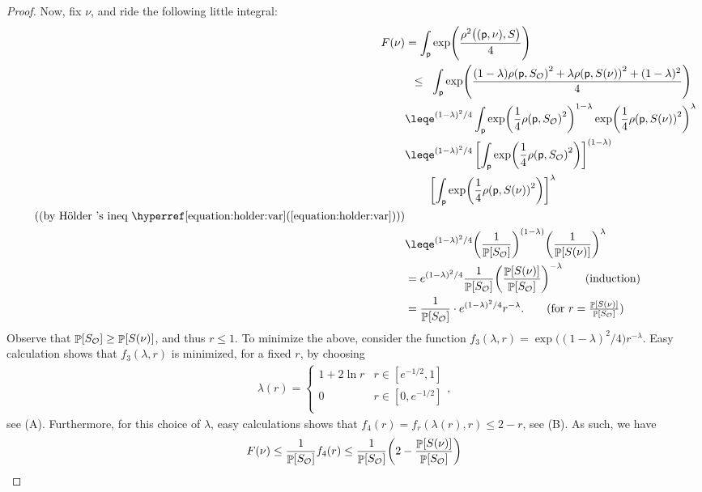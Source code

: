 \begin{proof}
    Now, fix $\nu$, and  ride the following little integral:
    \begin{align*}
      F(\nu)%
      &=%
        \int_\pnt  \exp \pth{\frac{\distTSqY{\bigl.(\pnt,\nu)}{\SetA}
        }{4}} 
     \\&
     \LEQ %
     \int_\pnt  \exp \pth{
        \frac{
           (1-\lambda)\distTY{\pnt}{\SetA_\OldOm}^2
           + \lambda \distTY{\pnt}{\SetA(\nu)}^2 + ( 1-\lambda)^2}{4}}
     \hspace{-5cm}%
     \\&%
     \leq%
     e^{(1-\lambda)^2 /4} 
     \int_\pnt  \exp \pth{
        \frac{1}{4}\distTY{\pnt}{\SetA_\OldOm}^2}^{1-\lambda}
     \exp\pth{ \frac{1}{4} \distTY{\pnt}{\SetA(\nu)}^2 }^\lambda \\
     &\leq%
     e^{(1-\lambda)^2 /4} 
     \pbrcS{ \int_\pnt  \exp \pth{
           \frac{1}{4}\distTY{\pnt}{\SetA_\OldOm}^2}}^{(1-\lambda)}
     \\&\qquad
     \pbrcS{ \int_\pnt
        \exp\pth{ \frac{1}{4} \distTY{\pnt}{\SetA(\nu)}^2 }}^\lambda 
     \\
     \tag{\text{(by  \Holder's \si{ineq} \Eqrefbare{holder:var})}}
     \\&%
     \leq%
     e^{(1-\lambda)^2 /4} 
     \pth{ \frac{1}{\Prob{ \SetA_\OldOm}} }^{(1-\lambda)}
     \pth{ \frac{1}{\Prob{ \SetA(\nu) } } }^\lambda 
     \\&
     =%
     e^{(1-\lambda)^2 /4} 
     \frac{1}{\Prob{ \SetA_\OldOm}}
     \pth{ \frac{\Prob{ \SetA(\nu) }}{\Prob{ \SetA_\OldOm}} }^{-\lambda} 
     \tag{induction}
     \\&%
     =%
     \frac{1}{\Prob{ \SetA_\OldOm}}
     \cdot 
     e^{(1-\lambda)^2 /4} 
     r^{-\lambda}.
     \tag{for $r = \frac{\Prob{ \SetA(\nu) }} {\Prob{
              \SetA_\OldOm}}$}
    \end{align*}
    Observe that $\Prob{ \SetA_\OldOm} \geq \Prob{ \SetA(\nu) }$, and
    thus $r \leq 1 $. To minimize the above, consider the function
    $f_3(\lambda,r) = \exp\bigl( (1-\lambda)^2/4 )r^{-\lambda}$. Easy
    calculation shows that $f_3(\lambda,r) $ is minimized, for a fixed
    $r$, by choosing
    \begin{align*}
        \lambda(r) =
        \begin{cases}
            1 + 2\ln r & r \in [e^{-1/2},1]\\
            0 & r \in [0, e^{-1/2}]\\
        \end{cases},
    \end{align*}
    see  (A). Furthermore, for this choice of $\lambda$,
    easy calculations shows that
    $f_4(r) = f_r( \lambda(r), r) \leq 2-r$, see  (B).
    As such, we have
    \begin{equation*}
        F(\nu) %
        \leq %
        \frac{1}{\Prob{ \SetA_\OldOm}} f_4(r)
        \leq%
        \frac{1}{\Prob{ \SetA_\OldOm}}
        \pth{2-  \frac{\Prob{ \SetA(\nu) }} {\Prob{
                 \SetA_\OldOm}}}
    \end{equation*}
    

\end{proof}
